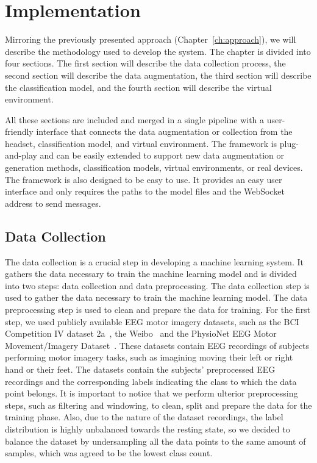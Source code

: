 \chapter{Implementation}\label{ch:methodology}
Mirroring the previously presented approach (Chapter~\ref{ch:approach}), we will describe the methodology used to develop the system.
The chapter is divided into four sections.
The first section will describe the data collection process, the second section will describe the data augmentation, the third section will describe the classification model, and the fourth section will describe the virtual environment.

All these sections are included and merged in a single pipeline with a user-friendly interface that connects the data augmentation or collection from the headset, classification model, and virtual environment.
The framework is plug-and-play and can be easily extended to support new data augmentation or generation methods, classification models, virtual environments, or real devices.
The framework is also designed to be easy to use. It provides an easy user interface and only requires the paths to the model files and the WebSocket address to send messages.


\section{Data Collection}
The data collection is a crucial step in developing a machine learning system.
It gathers the data necessary to train the machine learning model and is divided into two steps: data collection and data preprocessing.
The data collection step is used to gather the data necessary to train the machine learning model.
The data preprocessing step is used to clean and prepare the data for training.
For the first step, we used publicly available EEG motor imagery datasets, such as the BCI Competition IV dataset 2a~\cite{tangermann2012review}, the Weibo~\cite{yi2014evaluation} and the PhysioNet EEG Motor Movement/Imagery Dataset~\cite{goldberger2000physiobank, schalk2004bci2000}.
These datasets contain EEG recordings of subjects performing motor imagery tasks, such as imagining moving their left or right hand or their feet.
The datasets contain the subjects' preprocessed EEG recordings and the corresponding labels indicating the class to which the data point belongs.
It is important to notice that we perform ulterior preprocessing steps, such as filtering and windowing, to clean, split and prepare the data for the training phase.
Also, due to the nature of the dataset recordings, the label distribution is highly unbalanced towards the resting state, so we decided to balance the dataset by undersampling all the data points to the same amount of samples, which was agreed to be the lowest class count.
